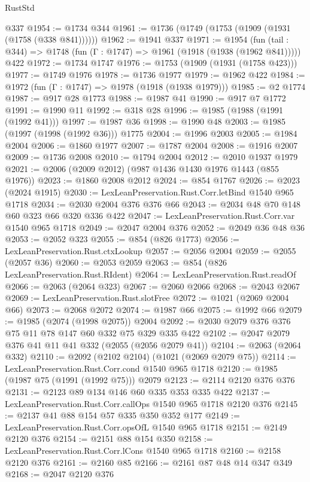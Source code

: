 \begin{lexlean}{RustStd}
\begin{coremodule}
    @337
@1954 := @1734 @344
@1961 := @1736 (@1749 (@1753 (@1909 (@1931 (@1758 (@338 @841))))))
@1962 := @1941 @337
@1971 := @1954
    (fun (tail : @344) => @1748 (fun (Γ : @1747) => @1961 (@1918 (@1938 (@1962 @841)))))
    @422
@1972 := @1734 @1747
@1976 := @1753 (@1909 (@1931 (@1758 @423)))
@1977 := @1749 @1976
@1978 := @1736 @1977
@1979 := @1962 @422
@1984 := @1972 (fun (Γ : @1747) => @1978 (@1918 (@1938 @1979)))
@1985 := @2 @1774
@1987 := @917 @28 @1773
@1988 := @1987 @41
@1990 := @917 @7 @1772
@1991 := @1990 @11
@1992 := @318 @28
@1996 := @1985 (@1988 (@1991 (@1992 @41)))
@1997 := @1987 @36
@1998 := @1990 @48
@2003 := @1985 (@1997 (@1998 (@1992 @36))) @1775
@2004 := @1996 @2003
@2005 := @1984 @2004
@2006 := @1860 @1977
@2007 := @1787 @2004
@2008 := @1916 @2007
@2009 := @1736 @2008
@2010 := @1794 @2004
@2012 := @2010 @1937 @1979
@2021 := @2006 (@2009 @2012) (@987 @1436 @1430 @1976 @1443 (@855 @1976))
@2023 := @1860 @2008 @2012
@2024 := @854 @1767
@2026 := @2023 (@2024 @1915)
@2030 := LexLeanPreservation.Rust.Corr.letBind @1540 @965 @1718
@2034 := @2030 @2004 @376 @376 @66
@2043 := @2034 @48 @70 @148 @60 @323 @66 @320 @336 @422
@2047 := LexLeanPreservation.Rust.Corr.var @1540 @965 @1718
@2049 := @2047 @2004 @376
@2052 := @2049 @36 @48 @36
@2053 := @2052 @323
@2055 := @854 (@826 @1773)
@2056 := LexLeanPreservation.Rust.ctxLookup
@2057 := @2056 @2004
@2059 := @2055 (@2057 @36)
@2060 := @2053 @2059
@2063 := @854 (@826 LexLeanPreservation.Rust.RIdent)
@2064 := LexLeanPreservation.Rust.readOf
@2066 := @2063 (@2064 @323)
@2067 := @2060 @2066
@2068 := @2043 @2067
@2069 := LexLeanPreservation.Rust.slotFree
@2072 := @1021 (@2069 @2004 @66)
@2073 := @2068 @2072
@2074 := @1987 @66
@2075 := @1992 @66
@2079 := @1985 (@2074 (@1998 @2075)) @2004
@2092 := @2030 @2079 @376 @376 @75 @11 @78 @147 @60 @332 @75 @329 @335 @422
@2102 := @2047 @2079 @376 @41 @11 @41 @332 (@2055 (@2056 @2079 @41))
@2104 := @2063 (@2064 @332)
@2110 := @2092 (@2102 @2104) (@1021 (@2069 @2079 @75))
@2114 := LexLeanPreservation.Rust.Corr.cond @1540 @965 @1718
@2120 := @1985 (@1987 @75 (@1991 (@1992 @75))) @2079
@2123 := @2114 @2120 @376 @376
@2131 := @2123 @89 @134 @146 @60 @335 @353 @335 @422
@2137 := LexLeanPreservation.Rust.Corr.callOps @1540 @965 @1718 @2120 @376
@2145 := @2137 @41 @88 @154 @57 @335 @350 @352 @177
@2149 := LexLeanPreservation.Rust.Corr.opsOfL @1540 @965 @1718
@2151 := @2149 @2120 @376
@2154 := @2151 @88 @154 @350
@2158 := LexLeanPreservation.Rust.Corr.lCons @1540 @965 @1718
@2160 := @2158 @2120 @376
@2161 := @2160 @85
@2166 := @2161 @87 @48 @14 @347 @349
@2168 := @2047 @2120 @376

\end{coremodule}
\end{lexlean}
